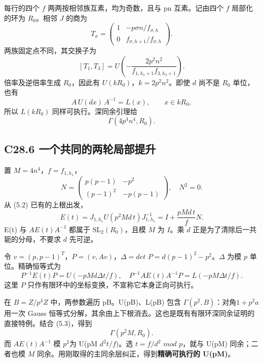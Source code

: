 \documentclass[11pt,a4paper]{article}
\theoremstyle{definition}
\numberwithin{equation}{section}
\begin{document}
{每行的四个} {\ensuremath{f}} {两两按相邻族互素，均为奇数，且与} {pn} {互素。记由四个} {\ensuremath{f}} {局部化的环为} {\ensuremath{R_{0}}。相邻} {\ensuremath{J}} {的商为} \[
T_\sigma=
\begin{pmatrix}
1&-p\sigma n/f_{\sigma,h}\\
0&f_{\sigma,h+1}/f_{\sigma,h}
\end{pmatrix}.
\] {两族固定点不同，其交换子为} \[
\boxed{
[T_1,T_3]
=U\left(-\frac{2p^2n^2}{f_{1,h_1+1}f_{3,h_3+1}}\right).
}
\tag{C28.5.2}
\] {倍率及逆倍率生成} {\ensuremath{R_{0}}，因此有} {\ensuremath{U(kR_{0})}，\ensuremath{k=2p^{2}n^{2}}。即使} {\ensuremath{d}} {尚不是} {\ensuremath{R_{0}}} {单位，也有} \[
A\,U(dx)\,A^{-1}=L(x),\qquad x\in kR_0,
\] {所以} {\ensuremath{L(kR_{0})}} {同样可执行。深同余引理给} \[
\Gamma(4p^4n^4,R_0).
\tag{C28.5.3}
\]

\subsection*{\texorpdfstring{{C28.6} {一个共同的两轮局部提升}}{C28.6 一个共同的两轮局部提升}}\label{C28-h179}

{置} {\ensuremath{M=4n^{4}}，\ensuremath{f=f_{1,h_{1}}}，} \[
N=\begin{pmatrix}p(p-1)&-p^2\\(p-1)^2&-p(p-1)\end{pmatrix},
\quad N^2=0.
\] {从} {(5.2)} {已有的上根出发，} \[
E(t)=J_{1,h_1}U(p^2Md\,t)J_{1,h_1}^{-1}
=I+\frac{pMd\,t}{f}N.
\tag{C28.6.1}
\] {E(t)} {与} {\ensuremath{AE(t)A^{-1}}} {都属于} {\ensuremath{\mathrm{SL}_{2}(R_{0})}，且模} {\ensuremath{M}} {为} {\ensuremath{I}。乘} {\ensuremath{d}} {正是为了清除后一共轭的分母，不要求} {\ensuremath{d}} {先可逆。}

{令} {\ensuremath{v=(p,p-1)^T}，\ensuremath{P=(v,Av)}，\ensuremath{\Delta =det}} {\ensuremath{P=d(p-1)^{2}-p^{2}}。\ensuremath{\Delta }} {为模} {\ensuremath{p}} {单位。精确恒等式为} \[
P^{-1}E(t)P=U(-pMd\Delta t/f),\quad
P^{-1}AE(t)A^{-1}P=L(-pM\Delta t/f).
\tag{C28.6.2}
\] {这里} {\ensuremath{P}} {只作有限环中的坐标变换，不宣称它本身正向可执行。}

{在} {\ensuremath{B=Z/p^{4}Z}} {中，两参数遍历} {pB。U(pB)、L(pB)} {包含} {\ensuremath{\Gamma (p^{2},B)}：对角\ensuremath{1+p^{2}a}用一次} {Gauss} {恒等式分解，其余由上下根消去。这也是既有有限环深同余证明的直接特例。结合} {(5.3)，得到} \[
\Gamma(p^2M,R_0).
\] {而} {\ensuremath{AE(t)A^{-1}}} {模} {\ensuremath{p^{2}}为} {U(pM} {\ensuremath{d^{2}t/f)}。选} {\ensuremath{t=f/d^{2}}} {\ensuremath{mod}} {\ensuremath{p}，就与} {U(pM)} {同余；二者也模} {\ensuremath{M}} {同余。用刚取得的主同余层纠正，得到}\textbf{{精确可执行的} {U(pM)}}{。}
\end{document}
